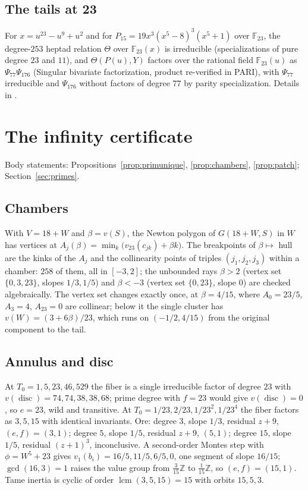 \documentclass[11pt]{amsart}
\newcommand{\ZZ}{\mathbb{Z}}
\newcommand{\FF}{\mathbb{F}}
\theoremstyle{plain}
\theoremstyle{definition}
\begin{document}
\subsection*{The tails at 23}
For $x=u^{23}-u^9+u^2$ and for $P_{15}=19x^3(x^5-8)^3(x^5+1)$ over
$\FF_{23}$, the degree-$253$ heptad relation $\Theta$ over
$\FF_{23}(x)$ is irreducible (specializations of pure degree $23$ and
$11$), and $\Theta(P(u),Y)$ factors over the rational field
$\FF_{23}(u)$ as $\Psi_{77}\Psi_{176}$ (Singular bivariate
factorization, product re-verified in PARI), with $\Psi_{77}$
irreducible and $\Psi_{176}$ without factors of degree $77$ by parity
specialization. Details in \cite[heptad]{receipts}.

\section{The infinity certificate}\label{app:infinity}

Body statements: Propositions~\ref{prop:primunique},
\ref{prop:chambers}, \ref{prop:patch}; Section~\ref{sec:primes}.

\subsection*{Chambers}
With $V=18+W$ and $\beta=v(S)$, the Newton polygon of $G(18+W,S)$ in
$W$ has vertices at $A_j(\beta)=\min_k\bigl(v_{23}(c_{jk})+\beta k\bigr)$.
The breakpoints of $\beta\mapsto$ hull are the kinks of the $A_j$ and
the collinearity points of triples $(j_1,j_2,j_3)$ within a chamber:
$258$ of them, all in $[-3,2]$; the unbounded rays $\beta>2$ (vertex
set $\{0,3,23\}$, slopes $1/3,1/5$) and $\beta<-3$ (vertex set
$\{0,23\}$, slope $0$) are checked algebraically. The vertex set
changes exactly once, at $\beta=4/15$, where $A_0=23/5$, $A_3=4$,
$A_{23}=0$ are collinear; below it the single cluster has
$v(W)=(3+6\beta)/23$, which runs on $(-1/2,4/15)$ from the original
component to the tail.

\subsection*{Annulus and disc}
At $T_0=1,5,23,46,529$ the fiber is a single irreducible factor of
degree $23$ with $v(\operatorname{disc})=74,74,38,38,68$; prime degree
with $f=23$ would give $v(\operatorname{disc})=0$, so $e=23$, wild and
transitive. At $T_0=1/23,2/23,1/23^2,1/23^4$ the fiber factors as
$3,5,15$ with identical invariants. Ore: degree $3$, slope $1/3$,
residual $z+9$, $(e,f)=(3,1)$; degree $5$, slope $1/5$, residual $z+9$,
$(5,1)$; degree $15$, slope $1/5$, residual $(z+1)^3$, inconclusive. A
second-order Montes step with $\phi=W^5+23$ gives
$v_1(b_i)=16/5,11/5,6/5,0$, one segment of slope $16/15$;
$\gcd(16,3)=1$ raises the value group from $\frac3{15}\ZZ$ to
$\frac1{15}\ZZ$, so $(e,f)=(15,1)$. Tame inertia is cyclic of order
$\operatorname{lcm}(3,5,15)=15$ with orbits $15,5,3$.
\end{document}
